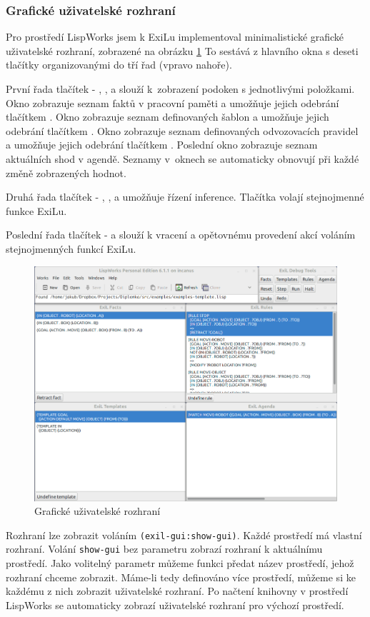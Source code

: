 \subsubsection{Grafické uživatelské rozhraní}

Pro prostředí LispWorks jsem k ExiLu implementoval minimalistické grafické
uživatelské rozhraní, zobrazené na obrázku \ref{gui} To sestává z hlavního okna
s deseti tlačítky organizovanými do tří řad (vpravo nahoře).

První řada tlačítek - , ,  a 
slouží k~zobrazení podoken s jednotlivými položkami. Okno  zobrazuje
seznam faktů v pracovní paměti a umožňuje jejich odebrání tlačítkem
. Okno  zobrazuje seznam definovaných šablon a
umožňuje jejich odebrání tlačítkem . Okno 
zobrazuje seznam definovaných odvozovacích pravidel a umožňuje jejich odebrání
tlačítkem . Poslední okno  zobrazuje seznam
aktuálních shod v agendě. Seznamy v~oknech se automaticky obnovují při každé
změně zobrazených hodnot.

Druhá řada tlačítek - , ,  a  umožňuje
řízení inference. Tlačítka volají stejnojmenné funkce ExiLu.

Poslední řada tlačítek -  a  slouží k vracení a opětovnému
provedení akcí voláním stejnojmenných funkcí ExiLu.

\begin{figure}[h]
\includegraphics[width=\textwidth]{exil-gui.png}
\caption{Grafické uživatelské rozhraní}
\label{gui}
\end{figure}

Rozhraní lze zobrazit voláním \verb|(exil-gui:show-gui)|. Každé prostředí má
vlastní rozhraní. Volání \verb|show-gui| bez parametru zobrazí rozhraní k
aktuálnímu prostředí. Jako volitelný parametr můžeme funkci předat název
prostředí, jehož rozhraní chceme zobrazit. Máme-li tedy definováno více
prostředí, můžeme si ke každému z nich zobrazit uživatelské rozhraní. Po načtení
knihovny v prostředí LispWorks se automaticky zobrazí uživatelské rozhraní pro
výchozí prostředí.
